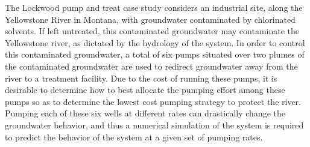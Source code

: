 \documentclass[12pt]{article}
\begin{document}
%
%


The Lockwood pump and treat case study considers an industrial site, along the Yellowstone River in Montana, with groundwater contaminated by chlorinated solvents. %
%
If left untreated, this contaminated groundwater may contaminate the Yellowstone river, as dictated by the hydrology of the system. %
In order to control this contaminated groundwater, a total of six pumps situated over two plumes of the contaminated groundwater are used to redirect groundwater away from the river to a treatment facility.
%
Due to the cost of running these pumps, it is desirable to determine how to best allocate the pumping effort among these pumps so as to determine the lowest cost pumping strategy to protect the river.
%
Pumping each of these six wells at different rates can drastically change the groundwater behavior, and  thus a numerical simulation of the system is required to predict the behavior of the system at a given set of pumping rates. %
%
%

%
%
\end{document}

